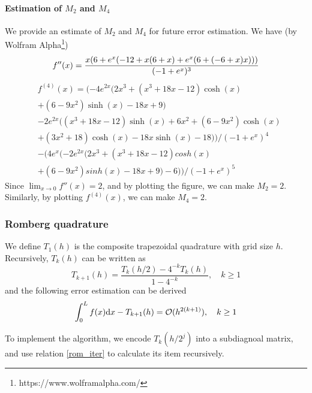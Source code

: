 \documentclass[conference,onecolumn,12pt]{IEEEtran}
\theoremstyle{definition}
\begin{document}
\paragraph{Estimation of $M_2$ and $M_4$}
We provide an estimate of $M_2$ and $M_4$ for future error estimation. We have (by Wolfram Alpha\footnote{https://www.wolframalpha.com/})
\begin{equation}
        f''(x)=\frac{x (6 + e^x (-12 + x (6 + x) + e^x (6 + (-6 + x) x)))}{(-1 + e^x)^3}\\
    \end{equation}
    \begin{equation}
        \begin{split}
            &f^{(4)}(x) = (-4 e^{2 x} (2 x^3 + (x^3 + 18 x - 12) \cosh (x) \\
            & +(6 - 9 x^2) \sinh(x) - 18 x + 9) \\
            &- 2 e^{2 x} ((x^3 + 18 x - 12) \sinh(x) + 6 x^2 + (6 - 9 x^2) \cosh(x) \\
            &+(3 x^2 + 18) \cosh(x) - 18 x \sinh(x) - 18))/(-1 + e^x)^4 \\
             &-(4 e^x (-2 e^{2 x} (2 x^3 + (x^3 + 18 x - 12) cosh(x) \\
             &+ (6 - 9 x^2) sinh(x) - 18 x + 9) - 6))/(-1 + e^x)^5
        \end{split}
    \end{equation}
Since $\lim_{x\to 0}f''(x)=2$, and by plotting the figure, we can make $M_2=2$. Similarly, by plotting $f^{(4)}(x)$, we can make $M_4=2$.


\subsubsection{Romberg quadrature}

We define $T_1(h)$ is the composite trapezoidal quadrature with grid size $h$. Recursively, $T_k(h)$ can be written as 
\begin{equation}
    \label{rom_iter}
    T_{k+1}(h)=\frac{T_k(h/2)-4^{-k}T_k(h)}{1-4^{-k}},\quad k \geq 1
\end{equation}
and the following error estimation can be derived
\begin{equation}
    \int_0^L f(x) {\rm d}x -T_{k+1}(h) = \mathcal{O}(h^{2(k+1)}),\quad k \geq 1
\end{equation}

To implement the algorithm, we encode $T_k(h/2^j)$ into a subdiagnoal matrix, and use relation \ref{rom_iter} to calculate its item recursively.
\end{document}
